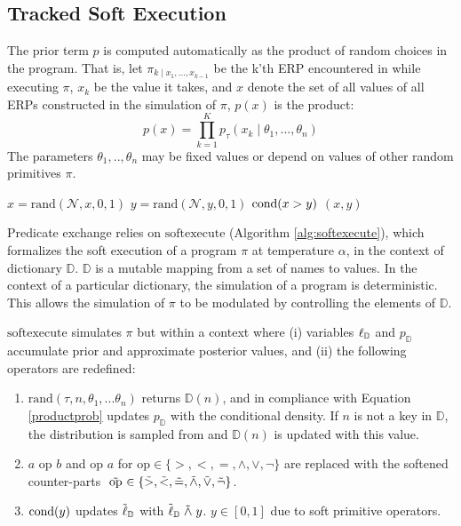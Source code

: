 \subsection{Tracked Soft Execution}
The prior term $p$ is computed automatically as the product of random choices in the program. 
That is, let $\pi_{k \mid x_1, ..., x_{k-1}}$ be the k'th ERP encountered in while executing $\pi$, $x_k$ be the value it takes, and $x$ denote the set of all values of all ERPs constructed in the simulation of $\pi$, $p(x)$ is the product:
\begin{equation}\label{productprob}
p(x) = \prod_{k=1}^K p_\tau(x_k \mid \theta_1,..., \theta_n )
\end{equation}
The parameters $\theta_1,..,\theta_n$ may be fixed values or depend on values of other random primitives $\pi$.

\begin{exprogram}[tb]
\caption{}
\label{prog:ex1}
\begin{algorithmic}
\STATE $x = \textrm{rand}(\mathcal{N}, x, 0, 1)$
\STATE $y = \textrm{rand}(\mathcal{N}, y, 0, 1)$
\STATE $\operatorname{cond}(x > y)$
 $(x, y)$
\end{algorithmic}
\end{exprogram}


Predicate exchange relies on $\textrm{softexecute}$
(Algorithm \ref{alg:softexecute}), which formalizes the soft execution of a program $\pi$ at temperature $\alpha$, in the context of dictionary $\mathbb{D}$.
$\mathbb{D}$ is a mutable mapping from a set of names to values.
In the context of a particular dictionary, the simulation of a program is deterministic.
This allows the simulation of $\pi$ to be modulated by controlling the elements of $\mathbb{D}$.

$\textrm{softexecute}$ simulates $\pi$ but within a context where (i) variables $\operatorname{\ell}_\mathbb{D}$ and $p_\mathbb{D}$ accumulate prior and approximate posterior values, and (ii) the following operators are redefined:

\begin{enumerate}
  \item $\textrm{rand}(\tau, n, \theta_1, ...\theta_n)$ returns $\mathbb{D}(n)$, and in compliance with Equation \ref{productprob} updates $p_\mathbb{D}$ with the conditional density. If $n$ is not a key in $\mathbb{D}$, the distribution is sampled from and $\mathbb{D}(n)$ is updated with this value.  
  \item $a \text{ op } b$ and $\textrm{op } a$ for $\textrm{op} \in \{>, <, =, \land, \lor, \neg\}$ are replaced with the softened counter-parts $\mathrel{\tilde{\textrm{ op }}} \in \{\mathrel{\tilde{>}}, \mathrel{\tilde{<}}, \mathrel{\tilde{=}}, \mathrel{\tilde{\land}}, \mathrel{\tilde{\lor}}, \mathrel{\tilde{\neg}}\}$.
  \item $\operatorname{cond}(y)$ updates $\tilde{\operatorname{\ell}}_\mathbb{D}$ with $\tilde{\operatorname{\ell}}_\mathbb{D} \mathrel{\tilde{\land}} y$. $y \in [0,1]$ due to soft primitive operators.  
\end{enumerate}

